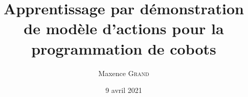 \makeatletter
\newcommand{\pagedegarde}{
\newgeometry{top=2.5cm, bottom=1cm, left=2cm, right=1cm}
  \begin{titlepage}
  \centering
      \texttt{[image: logo/logo-uga.png]}
      \hfill
      \texttt{[image: logo/Logo-cicular.pdf]}\\
    \vspace{5cm}
      {\Large \@ED}\\
    \vspace{1cm}
      {\huge
      	{\bfseries \@doctorat}\\
    \vspace{0.5cm}
      	Comité de Suivi Individuel}\\
    \vspace{0.5cm}
    	{\Large {\bfseries \@author}} \\
    \vspace{0.5cm}
    	le \@date \\
    \vspace{1cm}
       {\LARGE \bfseries{\@title}} \\
    \vspace{1cm}
        Directeur de thèse : {\bfseries \@directeur}\\
        Co-encadrant de thèse : {\bfseries \@encadrant}\\
    \vspace{1.5cm}
	\begin{tabular}{>{\bfseries}lll}
		\@jurya
		\@juryb
	\end{tabular}
  \end{titlepage}




\restoregeometry
}

\author{Maxence \textsc{Grand}}
\title{Apprentissage par démonstration de modèle d'actions pour la programmation de cobots}
\date{9 avril 2021}
